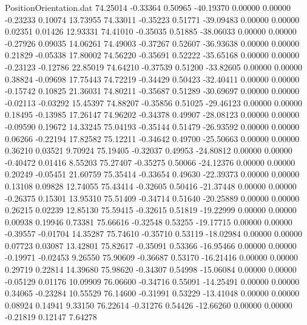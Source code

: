 \begin{filecontents}{PositionOrientation.dat}
  74.25014   -0.33364    0.50965   -40.19370    0.00000    0.00000   -0.23233    0.10074   13.73955
  74.33011   -0.35223    0.51771   -39.09483    0.00000    0.00000    0.02351    0.01426   12.93331
  74.41010   -0.35035    0.51885   -38.06033    0.00000    0.00000   -0.27926    0.09035   14.06261
  74.49003   -0.37267    0.52607   -36.93638    0.00000    0.00000    0.21829   -0.05338   17.80002
  74.56220   -0.35691    0.52222   -35.65168    0.00000    0.00000   -0.23123   -0.12786   22.85019
  74.64210   -0.37539    0.51200   -33.82605    0.00000    0.00000    0.38824   -0.09698   17.75443
  74.72219   -0.34429    0.50423   -32.40411    0.00000    0.00000   -0.15742    0.10825   21.36031
  74.80211   -0.35687    0.51289   -30.69697    0.00000    0.00000   -0.02113   -0.03292   15.45397
  74.88207   -0.35856    0.51025   -29.46123    0.00000    0.00000    0.18495   -0.13985   17.26147
  74.96202   -0.34378    0.49907   -28.08123    0.00000    0.00000   -0.09590    0.19672   14.33245
  75.04193   -0.35144    0.51479   -26.93592    0.00000    0.00000    0.06266   -0.22194   17.82582
  75.12211   -0.34642    0.49700   -25.50663    0.00000    0.00000    0.36210    0.03521    9.70924
  75.19405   -0.32037    0.49953   -24.80812    0.00000    0.00000   -0.40472    0.01416    8.55203
  75.27407   -0.35275    0.50066   -24.12376    0.00000    0.00000    0.20249   -0.05451   21.60759
  75.35414   -0.33654    0.49630   -22.39373    0.00000    0.00000    0.13108    0.09828   12.74055
  75.43414   -0.32605    0.50416   -21.37448    0.00000    0.00000   -0.26375    0.15301   13.95310
  75.51409   -0.34714    0.51640   -20.25889    0.00000    0.00000    0.26215    0.02239   12.85130
  75.59415   -0.32615    0.51819   -19.22999    0.00000    0.00000    0.00938    0.19946    0.73381
  75.66616   -0.32548    0.53255   -19.17715    0.00000    0.00000   -0.39557   -0.01704   14.35287
  75.74610   -0.35710    0.53119   -18.02984    0.00000    0.00000    0.07723    0.03087   13.42801
  75.82617   -0.35091    0.53366   -16.95466    0.00000    0.00000   -0.19971   -0.02453    9.26550
  75.90609   -0.36687    0.53170   -16.21416    0.00000    0.00000    0.29719    0.22814   14.39680
  75.98620   -0.34307    0.54998   -15.06084    0.00000    0.00000   -0.05129    0.01176   10.09909
  76.06600   -0.34716    0.55091   -14.25491    0.00000    0.00000    0.34065   -0.23284   10.55529
  76.14600   -0.31991    0.53229   -13.41048    0.00000    0.00000    0.08924    0.14941    9.33150
  76.22614   -0.31276    0.54426   -12.66260    0.00000    0.00000   -0.21819    0.12147    7.64278

\end{filecontents}
